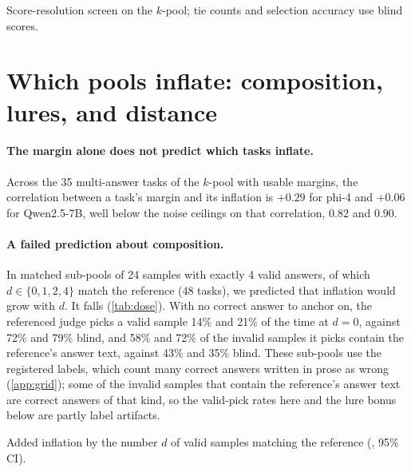 \begin{table}[htbp]
\centering
\caption{Score-resolution screen on the $k$-pool; tie counts and selection accuracy use blind scores.\pre}
\label{tab:resolution}
\footnotesize
\begin{adjustbox}{max width=\linewidth}\end{adjustbox}

\end{table}

\FloatBarrier
\section{Which pools inflate: composition, lures, and distance}
\label{app:composition}

\paragraph{The margin alone does not predict which tasks inflate.}
Across the 35 multi-answer tasks of the $k$-pool with usable margins, the correlation between a task's margin and its inflation is $+0.29$ for phi-4 and $+0.06$ for Qwen2.5-7B, well below the noise ceilings on that correlation, $0.82$ and $0.90$.

\paragraph{A failed prediction about composition.}
In matched sub-pools of 24 samples with exactly 4 valid answers, of which $d \in \{0,1,2,4\}$ match the reference (48 tasks), we predicted that inflation would grow with $d$. It falls (\cref{tab:dose}). With no correct answer to anchor on, the referenced judge picks a valid sample 14\% and 21\% of the time at $d{=}0$, against 72\% and 79\% blind, and 58\% and 72\% of the invalid samples it picks contain the reference's answer text, against 43\% and 35\% blind. These sub-pools use the registered labels, which count many correct answers written in prose as wrong (\cref{app:grid}); some of the invalid samples that contain the reference's answer text are correct answers of that kind, so the valid-pick rates here and the lure bonus below are partly label artifacts.

\begin{table}[htbp]
\centering
\caption{Added inflation by the number $d$ of valid samples matching the reference (\sd, 95\% CI).\pre}
\label{tab:dose}
\footnotesize
\begin{adjustbox}{max width=\linewidth}\end{adjustbox}

\end{table}

